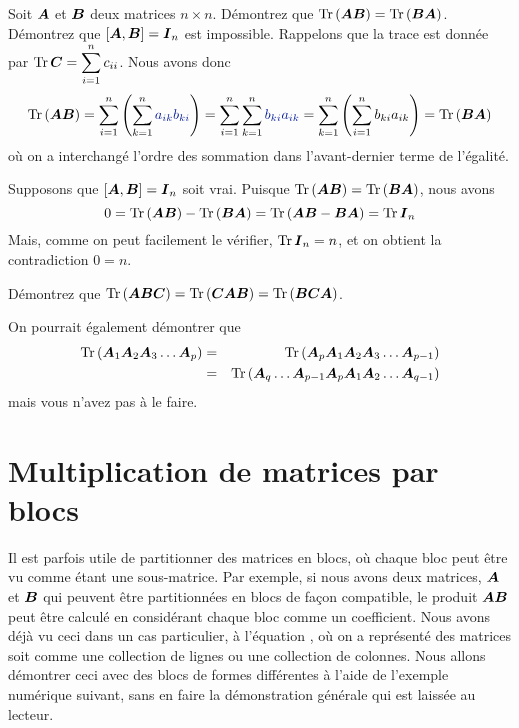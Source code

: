  \begin{exemple}
     Soit $\boldsymbol{A}$ et $\boldsymbol{B}$ deux matrices $n\times n$.
      Démontrez que $\operatorname{Tr}{(\boldsymbol{A}\boldsymbol{B})} = \operatorname{Tr}{(\boldsymbol{B}\boldsymbol{A})}$.
      Démontrez que $[\boldsymbol{A},\boldsymbol{B}] = \boldsymbol{I}_n$ est impossible.
     \solution
      Rappelons que la trace est donnée par $\operatorname{Tr}{\boldsymbol{C}} = \displaystyle\sum_{i=1}^n c_{ii}$.  
     Nous avons donc
     \[
     \tr{(\matA\matB)} = \sum_{i=1}^n \left(\sum_{k=1}^n {\color{ExerciceCouleur} a_{ik} b_{ki}}\right) 
     = \sum_{i=1}^n \sum_{k=1}^n {\color{ExerciceCouleur}b_{ki} a_{ik}}
     = \sum_{k=1}^n \left(\sum_{i=1}^n b_{ki} a_{ik}\right)
     = \tr{(\matB\matA)}
    \]     
     où on a  interchangé l'ordre des sommation dans l'avant-dernier terme de l'égalité.
     
      Supposons que  $[\boldsymbol{A},\boldsymbol{B}] = \boldsymbol{I}_n$ soit vrai.  Puisque $\operatorname{Tr}{(\boldsymbol{A}\boldsymbol{B})} = \operatorname{Tr}{(\boldsymbol{B}\boldsymbol{A})}$, nous avons
     \[
     0 = \operatorname{Tr}{(\boldsymbol{A}\boldsymbol{B})} - \operatorname{Tr}{(\boldsymbol{B}\boldsymbol{A})} = \operatorname{Tr}{(\boldsymbol{A}\boldsymbol{B} - \boldsymbol{B}\boldsymbol{A})} = \operatorname{Tr}{\boldsymbol{I}_n}
     \]
     Mais, comme on peut facilement le vérifier, $\operatorname{Tr}{\boldsymbol{I}_n} = n$, et on obtient la contradiction $0=n$.
 \end{exemple}    
 
 \begin{exerciceB}
 Démontrez que $ \operatorname{Tr}{(\boldsymbol{A}\boldsymbol{B}\boldsymbol{C})} = \operatorname{Tr}{(\boldsymbol{C}\boldsymbol{A}\boldsymbol{B})} = \operatorname{Tr}{(\boldsymbol{B}\boldsymbol{C}\boldsymbol{A})}$.
 
 On pourrait également démontrer que 
 \begin{eqnarray*}
\operatorname{Tr}{(\boldsymbol{A}_1 \boldsymbol{A}_2 \boldsymbol{A}_3 \ldots \boldsymbol{A}_p)} &=& \operatorname{Tr}{(\boldsymbol{A}_p \boldsymbol{A}_1 \boldsymbol{A}_2 \boldsymbol{A}_3 \ldots \boldsymbol{A}_{p-1})} \\
& =& \operatorname{Tr}{(\boldsymbol{A}_q \ldots \boldsymbol{A}_{p-1} \boldsymbol{A}_p \boldsymbol{A}_1 \boldsymbol{A}_2 \ldots \boldsymbol{A}_{q-1})}
 \end{eqnarray*}
 mais vous n'avez pas à le faire.
 \end{exerciceB}
 
 \section{Multiplication de matrices par blocs}
 
 Il est parfois utile de partitionner des matrices en blocs, où chaque bloc
 peut être vu comme étant une sous-matrice.  
 Par exemple, si nous avons deux matrices, $\boldsymbol{A}$ et $\boldsymbol{B}$ qui peuvent être partitionnées en blocs
 de façon compatible, le produit $\boldsymbol{A}\boldsymbol{B}$ peut être calculé en considérant
 chaque bloc comme un coefficient.  
 Nous avons déjà vu ceci dans un cas particulier, à l'équation , où on a représenté
 des matrices soit comme une collection de lignes ou une collection de colonnes.
 Nous allons démontrer ceci avec des blocs de formes différentes à l'aide de l'exemple numérique suivant, 
 sans en faire la démonstration générale qui est laissée au lecteur.

